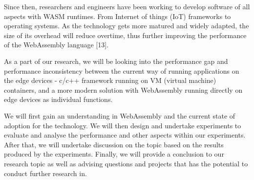 Since then, researchers and engineers have been working to develop software of all aspects with WASM runtimes. From Internet of things (IoT) frameworks to operating systems. As the technology gets more matured and widely adapted, the size of its overhead will reduce overtime, thus further improving the performance of the WebAssembly language [13].

As a part of our research, we will be looking into the performance gap and performance inconsistency between the current way of running applications on the edge devices - c/c++ framework running on VM (virtual machine) containers, and a more modern solution with WebAssembly running directly on edge devices as individual functions.

We will first gain an understanding in WebAssembly and the current state of adoption for the technology. We will then design and undertake experiments to evaluate and analyse the performance and other aspects within our experiments. After that, we will undertake discussion on the topic based on the results produced by the experiments. Finally, we will provide a conclusion to our research topic as well as advising questions and projects that has the potential to conduct further research in.